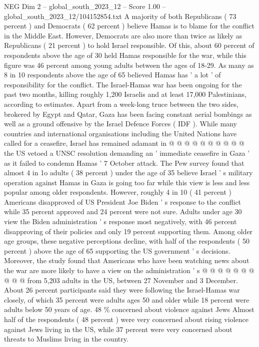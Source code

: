 \begin{textsample}{NEG Dim 2 – global\_south\_2023\_12 – Score 1.00 – global\_south\_2023\_12/104152854.txt}  \label{ex:f2_neg_290}
A majority of both Republicans ( 73 percent ) and Democrats ( 62 percent ) believe Hamas is to blame for the conflict in the Middle East.
However, Democrats are also more than twice as likely as Republicans ( 21 percent ) to hold Israel responsible.
Of this, about 60 percent of respondents above the age of 30 held Hamas responsible for the war, while this figure was 46 percent among young adults between the ages of 18-29.
As many as 8 in 10 respondents above the age of 65 believed Hamas has ' a lot ' of responsibility for the conflict.
The Israel-Hamas war has been ongoing for the past two months, killing roughly 1,200 Israelis and at least 17,000 Palestinians, according to estimates.
Apart from a week-long truce between the two sides, brokered by Egypt and Qatar, Gaza has been facing constant aerial bombings as well as a ground offensive by the Israel Defence Forces ( IDF ).
While many countries and international organisations including the United Nations have called for a ceasefire, Israel has remained adamant in @ @ @ @ @ @ @ @ @ @ the US vetoed a UNSC resolution demanding an ' immediate ceasefire in Gaza ' as it failed to condemn Hamas ' 7 October attack.
The Pew survey found that almost 4 in 1o adults ( 38 percent ) under the age of 35 believe Israel ' s military operation against Hamas in Gaza is going too far while this view is less and less popular among older respondents.
However, roughly 4 in 10 ( 41 percent ) Americans disapproved of US President Joe Biden ' s response to the conflict while 35 percent approved and 24 percent were not sure.
Adults under age 30 view the Biden administration ' s response most negatively, with 46 percent disapproving of their policies and only 19 percent supporting them.
Among older age groups, these negative perceptions decline, with half of the respondents ( 50 percent ) above the age of 65 supporting the US government ' s decisions.
Moreover, the study found that Americans who have been watching news about the war are more likely to have a view on the administration ' s @ @ @ @ @ @ @ @ @ @ from 5,203 adults in the US, between 27 November and 3 December.
About 26 percent participants said they were following the Israel-Hamas war closely, of which 35 percent were adults ages 50 and older while 18 percent were adults below 50 years of age. 48 \% concerned about violence against Jews Almost half of the respondents ( 48 percent ) were very concerned about rising violence against Jews living in the US, while 37 percent were very concerned about threats to Muslims living in the country.

\end{textsample}
